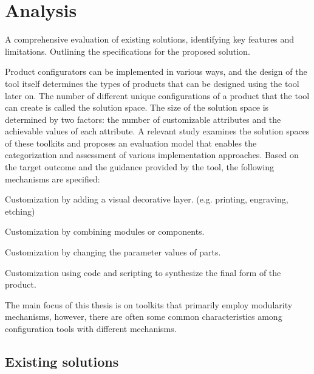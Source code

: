 \chapter{Analysis}

\begin{chapterabstract}
A comprehensive evaluation of existing solutions, identifying key features and limitations. Outlining the specifications for the proposed solution.
\end{chapterabstract}

Product configurators can be implemented in various ways, and the design of the tool itself determines the types of products that can be designed using the tool later on. The number of different unique configurations of a product that the tool can create is called the solution space. The size of the solution space is determined by two factors: the number of customizable attributes and the achievable values of each attribute. \cite{Huiwen2018} A relevant study examines the solution spaces of these toolkits and proposes an evaluation model that enables the categorization and assessment of various implementation approaches. Based on the target outcome and the guidance provided by the tool, the following mechanisms are specified: \cite{Hermans2012}

\begin{definition}[Veneer]
Customization by adding a visual decorative layer. (e.g. printing, engraving, etching)
\end{definition}
\begin{definition}[Modularity]
Customization by combining modules or components.
\end{definition}
\begin{definition}[Parametric]
Customization by changing the parameter values of parts.
\end{definition}
\begin{definition}[Generative]
Customization using code and scripting to synthesize the final form of the product.
\end{definition}

The main focus of this thesis is on toolkits that primarily employ modularity mechanisms, however, there are often some common characteristics among configuration tools with different mechanisms.


\section{Existing solutions}
